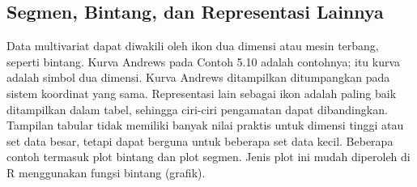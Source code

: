 \documentclass[a4paper,12pt]{article}
\theoremstyle{definition}
\begin{document}
\subsection{Segmen, Bintang, dan Representasi Lainnya}

Data multivariat dapat diwakili oleh ikon dua dimensi atau mesin terbang, seperti bintang. Kurva Andrews pada Contoh 5.10 adalah contohnya; itu kurva adalah simbol dua dimensi. Kurva Andrews ditampilkan ditumpangkan pada sistem koordinat yang sama. Representasi lain sebagai ikon adalah paling baik ditampilkan dalam tabel, sehingga ciri-ciri pengamatan dapat dibandingkan. Tampilan tabular tidak memiliki banyak nilai praktis untuk dimensi tinggi atau set data besar, tetapi dapat berguna untuk beberapa set data kecil. Beberapa contoh termasuk plot bintang dan plot segmen. Jenis plot ini mudah diperoleh di R menggunakan fungsi bintang (grafik). 
\end{document}
